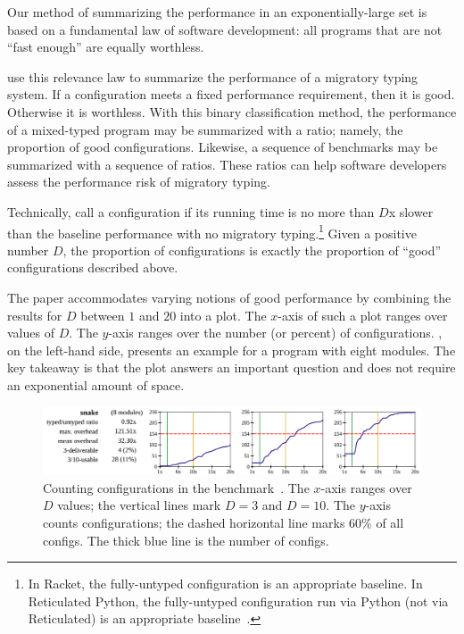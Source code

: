 

Our method of summarizing the performance in an exponentially-large set
 is based on a fundamental law of software development:
 all programs that are not ``fast enough'' are equally worthless.

\citet{tfgnvf-popl-2016} use this relevance law to summarize the performance
 of a migratory typing system.
If a configuration meets a fixed performance requirement, then it is good.
Otherwise it is worthless.
With this binary classification method, the performance of a mixed-typed
 program may be summarized with a ratio; namely,
 the proportion of good configurations.
Likewise, a sequence of benchmarks may be summarized with a sequence of ratios.
These ratios can help software developers assess the performance risk of
 migratory typing.

Technically, \citet{tfgnvf-popl-2016} call a configuration 
 if its running time is no more than $D$x slower than the baseline performance
 with no migratory typing.\footnote{In Racket, the fully-untyped configuration
 is an appropriate baseline. In Reticulated Python, the fully-untyped configuration
 run via Python (not via Reticulated) is an appropriate baseline~\cite{gm-pepm-2018}.}
Given a positive number $D$, the proportion of  configurations
 is exactly the proportion of ``good'' configurations described above.

The paper accommodates varying notions of good performance by combining the
 results for $D$ between $1$ and $20$ into a plot.
The $x$-axis of such a plot ranges over values of $D$.
The $y$-axis ranges over the number (or percent) of configurations.
, on the left-hand side, presents an example
 for a program with eight modules.
The key takeaway is that the plot answers an important question and does
 not require an exponential amount of space.

\begin{figure}[h]
\includegraphics[width=0.96\columnwidth]{src/snake-popl.png}
\caption{Counting  configurations in the 
         benchmark~\cite{tfgnvf-popl-2016}. The $x$-axis ranges over $D$ values;
         the vertical lines mark $D=3$ and $D=10$.
         The $y$-axis counts configurations; the dashed horizontal line marks
         $60$\% of all configs.
         The thick blue line is the number of  configs.}
\label{fig:snake-popl}
\end{figure}

